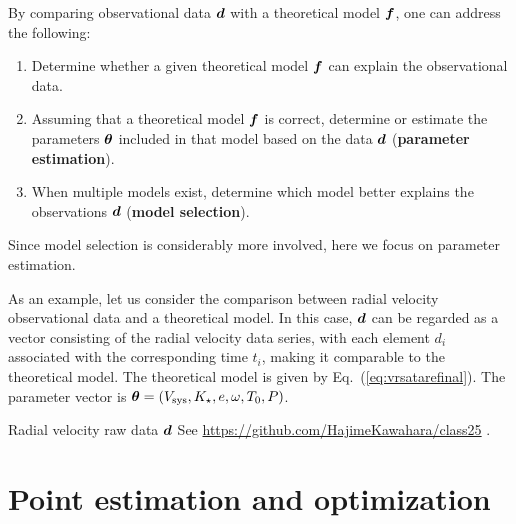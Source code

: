 
By comparing observational data $\boldsymbol{d}$ with a theoretical model $\boldsymbol{f}$, one can address the following:
\begin{enumerate}
\item Determine whether a given theoretical model $\boldsymbol{f}$ can explain the observational data.
\item Assuming that a theoretical model $\boldsymbol{f}$ is correct, determine or estimate the parameters $\boldsymbol{\theta}$ included in that model based on the data $\boldsymbol{d}$ ({\bf parameter estimation}).
\item When multiple models exist, determine which model better explains the observations $\boldsymbol{d}$ ({\bf model selection}).
\end{enumerate}

Since model selection is considerably more involved, here we focus on parameter estimation.

As an example, let us consider the comparison between radial velocity observational data and a theoretical model. In this case, $\boldsymbol{d}$ can be regarded as a vector consisting of the radial velocity data series, with each element $d_i$ associated with the corresponding time $t_i$, making it comparable to the theoretical model. The theoretical model is given by Eq.~(\ref{eq:vrsatarefinal}). The parameter vector is $\boldsymbol{\theta} = (V_\mathrm{sys}, K_\star, e, \omega, T_0, P)$.

\begin{itembox}{Radial velocity raw data $\boldsymbol{d}$}
\footnotesize
\color{gray}
See \href{https://github.com/HajimeKawahara/class25}{https://github.com/HajimeKawahara/class25}
.
\end{itembox}

\section{Point estimation and optimization}

